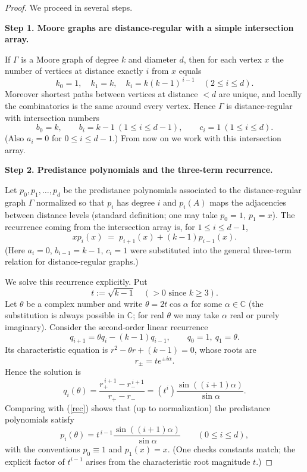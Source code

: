 \documentclass[12pt,a4paper,openany]{book}
\begin{document}
\begin{proof}
We proceed in several steps.

\medskip\noindent\textbf{Step 1. Moore graphs are distance-regular with a simple intersection array.}

If $\Gamma$ is a Moore graph of degree $k$ and diameter $d$, then for
each vertex $x$ the number of vertices at distance exactly $i$ from $x$
equals
\[
k_0=1,\quad k_1=k,\quad k_i = k(k-1)^{\,i-1}\quad(2\le i\le d).
\]
Moreover shortest paths between vertices at distance $<d$ are unique,
and locally the combinatorics is the same around every vertex. Hence
$\Gamma$ is distance-regular with intersection numbers
\[
b_0=k,\qquad b_i=k-1\ (1\le i\le d-1),\qquad c_i=1\ (1\le i\le d).
\]
(Also $a_i=0$ for $0\le i\le d-1$.) From now on we work with this
intersection array.

\medskip\noindent\textbf{Step 2. Predistance polynomials and the three-term recurrence.}

Let $p_0,p_1,\dots,p_d$ be the predistance polynomials associated to the
distance-regular graph $\Gamma$ normalized so that $p_i$ has degree $i$
and $p_i(A)$ maps the adjacencies between distance levels (standard
definition; one may take $p_0=1,\ p_1=x$). The recurrence coming from
the intersection array is, for $1\le i\le d-1$,
\begin{equation}\label{rec}
x p_i(x) \;=\; p_{i+1}(x) + (k-1) p_{i-1}(x).
\end{equation}
(Here $a_i=0$, $b_{i-1}=k-1$, $c_i=1$ were substituted into the general
three-term relation for distance-regular graphs.)

We solve this recurrence explicitly. Put
\[
t := \sqrt{k-1} \quad (>0 \text{ since } k\ge3).
\]
Let $\theta$ be a complex number and write $\theta = 2t\cos\alpha$ for
some $\alpha\in\mathbb C$ (the substitution is always possible in
$\mathbb C$; for real $\theta$ we may take $\alpha$ real or purely
imaginary). Consider the second-order linear recurrence
\[
q_{i+1} = \theta q_i - (k-1) q_{i-1},\qquad q_0=1,\ q_1=\theta.
\]
Its characteristic equation is $r^2 - \theta r + (k-1)=0$, whose roots
are
\[
r_{\pm} = t e^{\pm i\alpha}.
\]
Hence the solution is
\[
q_i(\theta) = \frac{r_{+}^{\,i+1}-r_{-}^{\,i+1}}{r_{+}-r_{-}}
= (t^i)\frac{\sin((i+1)\alpha)}{\sin\alpha}.
\]
Comparing with (\ref{rec}) shows that (up to normalization) the predistance
polynomials satisfy
\[
p_i(\theta) = t^{\,i-1}\frac{\sin((i+1)\alpha)}{\sin\alpha}\qquad(0\le i\le d),
\]
with the conventions $p_0\equiv1$ and $p_1(x)=x$. (One checks constants
match; the explicit factor of $t^{i-1}$ arises from the characteristic
root magnitude $t$.)


\end{proof}
\end{document}
